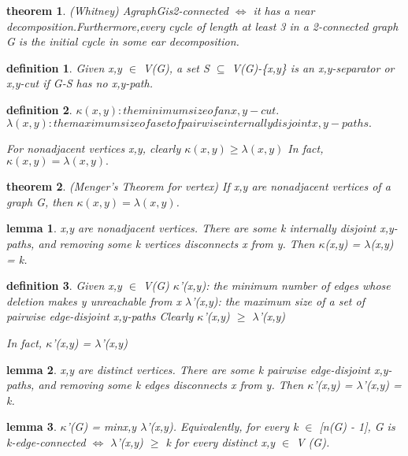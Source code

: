 \documentclass[twocolumn]{article}
\newtheorem{theorem}{theorem}[section]  %
\newtheorem{definition}{definition}
\newtheorem{lemma}{lemma}
\begin{document}
\begin{CJK*}{UTF8}{bkai}
    \begin{theorem}{(Whitney)}
        AgraphGis2-connected $\iff$ it has a near decomposition.Furthermore,every
 cycle of length at least 3 in a 2-connected graph G is the initial cycle in some
 ear decomposition.
    \end{theorem}

    \begin{definition}
         Given x,y $\in$ V(G), a set S $\subseteq $ V(G)-\{x,y\} is an x,y-separator or x,y-cut if
 G-S has no x,y-path.
    \end{definition}

    \begin{definition}
        $\kappa (x , y) : the minimum size of an x,y-cut.$
        $\lambda (x , y) :  the maximum size of a set of pairwise internally disjoint x,y-paths.$

        For nonadjacent vertices x,y, clearly $\kappa(x,y) \geq \lambda (x,y)$
 In fact, $\kappa(x,y) = \lambda(x,y).$
    \end{definition}

    \begin{theorem}{(Menger’s Theorem for vertex)}
         If x,y are nonadjacent vertices of a graph G, then $\kappa(x,y) = \lambda(x,y)$.
    \end{theorem}

    \begin{lemma}
         x,y are nonadjacent vertices. There are some k internally disjoint x,y-paths,
 and removing some k vertices disconnects x from y. Then
 $\kappa$(x,y) = $\lambda$(x,y) = k.
    \end{lemma}

    \begin{definition}
        Given x,y $\in$ V(G)
 $\kappa$'(x,y): the minimum number of edges whose deletion makes y unreachable
 from x
 $\lambda$'(x,y): the maximum size of a set of pairwise edge-disjoint x,y-paths
 Clearly $\kappa$'(x,y) $\geq$ $\lambda$'(x,y)

  In fact, $\kappa$'(x,y) = $\lambda$'(x,y)
    \end{definition}

    \begin{lemma}
        x,y are distinct vertices. There are some k pairwise edge-disjoint x,y-paths,
 and removing some k edges disconnects x from y. Then $\kappa$'(x,y) = $\lambda$'(x,y) = k.
    \end{lemma}

    \begin{lemma}
         $\kappa$'(G) = minx,y $\lambda$'(x,y). Equivalently, for every k $\in$ [n(G) - 1], G is
 k-edge-connected $\iff$ $\lambda$'(x,y) $\geq$ k for every distinct x,y $\in$ V (G).
    \end{lemma}


\end{CJK*}
\end{document}
